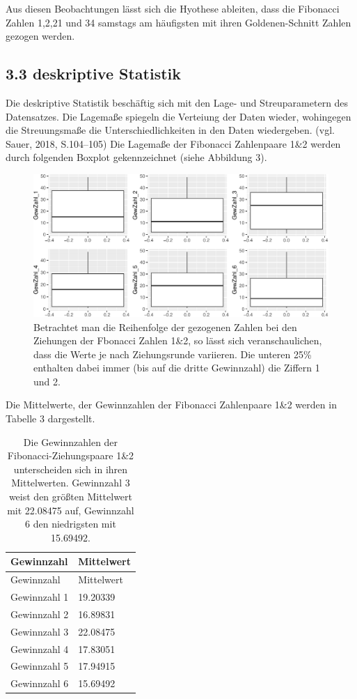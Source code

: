 \documentclass[ngerman,]{article}
\begin{document}
Aus diesen Beobachtungen lässt sich die Hyothese ableiten, dass die
Fibonacci Zahlen 1,2,21 und 34 samstags am häufigsten mit ihren
Goldenen-Schnitt Zahlen gezogen werden.

\subsection{3.3 deskriptive Statistik}\label{deskriptive-statistik}

Die deskriptive Statistik beschäftig sich mit den Lage- und
Streuparametern des Datensatzes. Die Lagemaße spiegeln die Verteiung der
Daten wieder, wohingegen die Streuungsmaße die Unterschiedlichkeiten in
den Daten wiedergeben. (vgl. Sauer, 2018, S.104--105) Die Lagemaße der
Fibonacci Zahlenpaare 1\&2 werden durch folgenden Boxplot gekennzeichnet
(siehe Abbildung 3).

\newpage

\begin{figure}

\includegraphics{Abbildung/a-1} \hfill{}

\caption{Betrachtet man die Reihenfolge der gezogenen Zahlen bei den Ziehungen der Fbonacci Zahlen 1\&2, so lässt sich veranschaulichen, dass die Werte je nach Ziehungsrunde variieren. Die unteren 25\% enthalten dabei immer (bis auf die dritte Gewinnzahl) die Ziffern 1 und 2.}\label{fig:a}
\end{figure}

Die Mittelwerte, der Gewinnzahlen der Fibonacci Zahlenpaare 1\&2 werden
in Tabelle 3 dargestellt.

\begin{longtable}[]{@{}ll@{}}
\caption{Die Gewinnzahlen der Fibonacci-Ziehungspaare 1\&2 unterscheiden
sich in ihren Mittelwerten. Gewinnzahl 3 weist den größten Mittelwert
mit 22.08475 auf, Gewinnzahl 6 den niedrigsten mit
15.69492.}\tabularnewline
\toprule
Gewinnzahl & Mittelwert\tabularnewline
\midrule
\endfirsthead
\toprule
Gewinnzahl & Mittelwert\tabularnewline
\midrule
\endhead
Gewinnzahl 1 & 19.20339\tabularnewline
Gewinnzahl 2 & 16.89831\tabularnewline
Gewinnzahl 3 & 22.08475\tabularnewline
Gewinnzahl 4 & 17.83051\tabularnewline
Gewinnzahl 5 & 17.94915\tabularnewline
Gewinnzahl 6 & 15.69492\tabularnewline
\bottomrule
\end{longtable}
\end{document}
